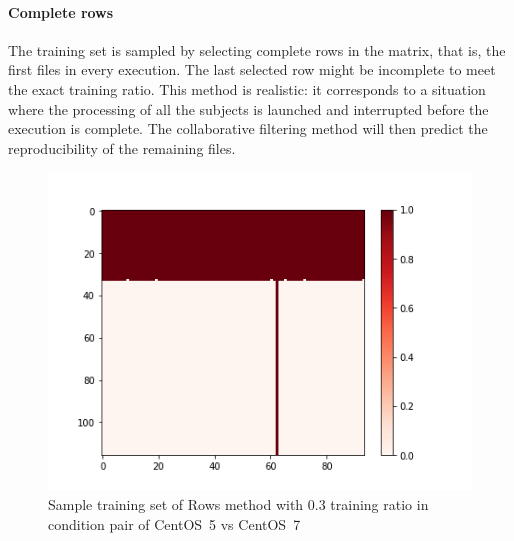 \documentclass[10pt, conference, compsocconf]{IEEEtran}
\begin{document}
\paragraph{Complete rows} The training set is sampled by selecting complete 
rows in the matrix, that is, the first files in
every execution. The last selected row might be incomplete to meet the
exact training ratio. This method is realistic: it corresponds to a
situation where the processing of all the subjects is launched and
interrupted before the execution is complete. The collaborative 
filtering method will then predict the reproducibility of the
remaining files.
\begin{figure}
  \includegraphics[width=\columnwidth]{figures/5vs7_rows_0.3_training_plot.png}
  \caption{Sample training set of Rows method with 0.3 training ratio in condition pair of CentOS~5 vs CentOS~7}
  \label{fig:Sample Training set }
\end{figure}

\end{document}
